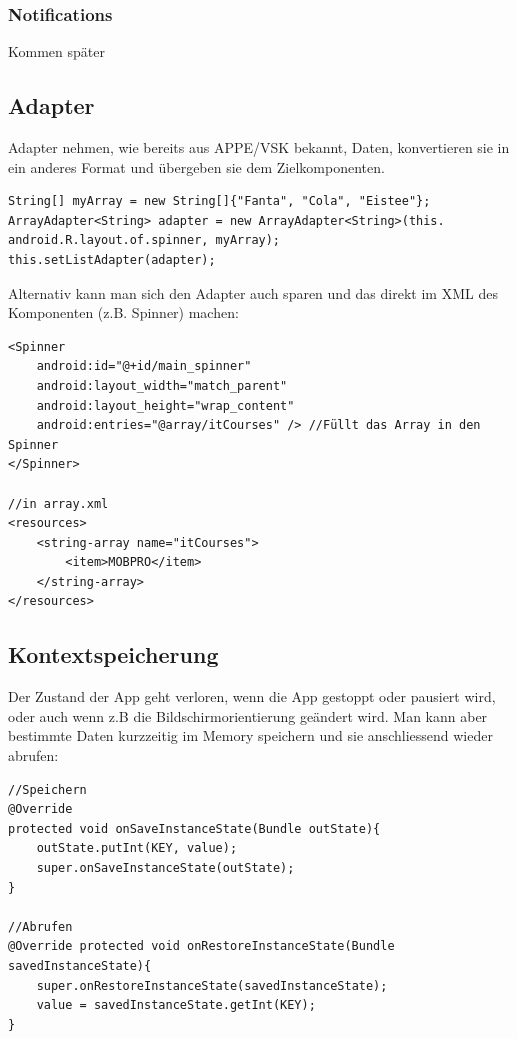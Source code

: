 \documentclass[a4paper, 11pt]{article}
\begin{document}
\subsubsection{Notifications}
Kommen später

\subsection{Adapter}
Adapter nehmen, wie bereits aus APPE/VSK bekannt, Daten, konvertieren sie in ein anderes Format und übergeben sie dem Zielkomponenten.

\begin{lstlisting}[caption={Array-Adapter um String Array in Spinner zu füllen}]
String[] myArray = new String[]{"Fanta", "Cola", "Eistee"};
ArrayAdapter<String> adapter = new ArrayAdapter<String>(this. android.R.layout.of.spinner, myArray);
this.setListAdapter(adapter);
\end{lstlisting}

Alternativ kann man sich den Adapter auch sparen und das direkt im XML des Komponenten (z.B. Spinner) machen:

\begin{lstlisting}[caption={Spinner-Layout mit direkten Füllen}]
<Spinner
	android:id="@+id/main_spinner"
	android:layout_width="match_parent"
	android:layout_height="wrap_content"
	android:entries="@array/itCourses" /> //Füllt das Array in den Spinner
</Spinner>

//in array.xml
<resources>
	<string-array name="itCourses">	
		<item>MOBPRO</item>
	</string-array>
</resources>
\end{lstlisting}

\subsection{Kontextspeicherung}
Der Zustand der App geht verloren, wenn die App gestoppt oder pausiert wird, oder auch wenn  z.B die Bildschirmorientierung geändert wird. Man kann aber bestimmte Daten kurzzeitig im Memory speichern und sie anschliessend wieder abrufen:

\begin{lstlisting}[caption={Abspeichern und Abrufen von Values im Memory}]
//Speichern
@Override
protected void onSaveInstanceState(Bundle outState){
	outState.putInt(KEY, value);
	super.onSaveInstanceState(outState);
}

//Abrufen
@Override protected void onRestoreInstanceState(Bundle savedInstanceState){
	super.onRestoreInstanceState(savedInstanceState);
	value = savedInstanceState.getInt(KEY);
}
\end{lstlisting}
\end{document}
